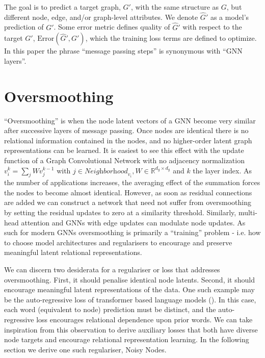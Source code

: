 \documentclass{article} \usepackage{iclr2022_conference,times}
\begin{document}
The goal is to predict a target graph, $G'$, with the same structure as $G$, but different node, edge, and/or graph-level attributes. We denote $\hat{G}'$ as a model's prediction of $G'$. Some error metric defines quality of $\hat{G}'$ with respect to the target $G'$, $\text{Error}(\hat{G}', G')$, which the training loss terms are defined to optimize. In this paper the phrase ``message passing steps'' is synonymous with ``GNN layers''. 

\section{Oversmoothing}

``Oversmoothing'' is when the node latent vectors of a GNN become very similar after successive layers of message passing. Once nodes are identical there is no relational information contained in the nodes, and no higher-order latent graph representations can be learned. It is easiest to see this effect with the update function of a Graph Convolutional Network with no adjacency normalization $v^k_i = \sum_j Wv^{k-1}_j$ with $j \in \textit{Neighborhood}_{v_i}, W \in \mathbb{R}^{d_g \times d_g}$ and $k$ the layer index. As the number of applications increases, the averaging effect of the summation forces the nodes to become almost identical. However, as soon as residual connections are added we can construct a network that need not suffer from oversmoothing by setting the residual updates to zero at a  similarity threshold. Similarly, multi-head attention \cite{Vaswani2017AttentionIA, Velickovic2018graph} and GNNs with edge updates \citep{Battaglia2018RelationalIB, Gilmer2017NeuralMP} can modulate node updates. As such for modern GNNs oversmoothing is primarily a ``training'' problem - i.e. how to choose model architectures and regularisers to encourage and preserve meaningful latent relational representations.

We can discern two desiderata for a regulariser or loss that addresses oversmoothing. First, it should penalise identical node latents. Second, it should encourage meaningful latent representations of the data. One such example may be the auto-regressive loss of transformer based language models (\cite{Brown2020LanguageMA}). In this case, each word (equivalent to node) prediction must be distinct, and the auto-regressive loss encourages relational dependence upon prior words. We can take inspiration from this observation to derive auxiliary losses that both have diverse node targets and encourage relational representation learning. In the following section we derive one such regulariser, Noisy Nodes.
\end{document}
